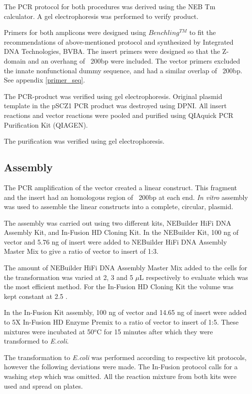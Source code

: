\documentclass{article}
\begin{document}
\begin{multicols}{2}
	The PCR protocol for both procedures was derived using the NEB Tm calculator.
	A gel electrophoresis was performed to verify product. 
	
	Primers for both amplicons were designed using $Benchling^{TM}$ to fit the recommendations of above-mentioned protocol and synthesized by Integrated DNA Technologies, BVBA. The insert primers were designed so that the Z-domain and an overhang of ~200bp were included. The vector primers excluded the innate nonfunctional dummy sequence, and had a similar overlap of ~200bp. See appendix \ref{primer_seq}.
	
	The PCR-product was verified using gel electrophoresis.
	Original plasmid template in the pSCZ1 PCR product was destroyed using DPNI. All insert reactions and vector reactions were pooled and purified using QIAquick PCR Purification Kit (QIAGEN). 
	
	The purification was verified using gel electrophoresis.
	
	 
	\subsection{Assembly}
	The PCR amplification of the vector created a linear construct. This fragment and the insert had an homologous region of ~200bp at each end. \textit{In vitro} assembly was used to assemble the linear constructs into a complete, circular, plasmid. 
	
	The assembly was carried out using two different kits, NEBuilder HiFi DNA Assembly Kit, and In-Fusion HD Cloning Kit. In the NEBuilder Kit, 100 ng of vector and 5.76 ng of insert were added to NEBuilder HiFi DNA Assembly Master Mix to give a ratio of vector to insert of 1:3.
	
	The amount of NEBuilder HiFi DNA Assembly Master Mix added to the cells for the transformation was varied at 2, 3 and 5 $\mu$L respectively to evaluate which was the most efficient method. For the In-Fusion HD Cloning Kit the volume was kept constant at 2.5 .
	
	In the In-Fusion Kit assembly, 100 ng of vector and 14.65 ng of insert were added to 5X In-Fusion HD Enzyme Premix to a ratio of vector to insert of 1:5. These mixtures were incubated at 50$^o$C for 15 minutes after which they were transformed to \textit{E.coli}.
	
	The transformation to \textit{E.coli} was performed according to respective kit protocols, however the following deviations were made. The In-Fusion protocol calls for a washing step which was omitted. All the reaction mixture from both kits were used and spread on plates. 
	

\end{multicols}
\end{document}
